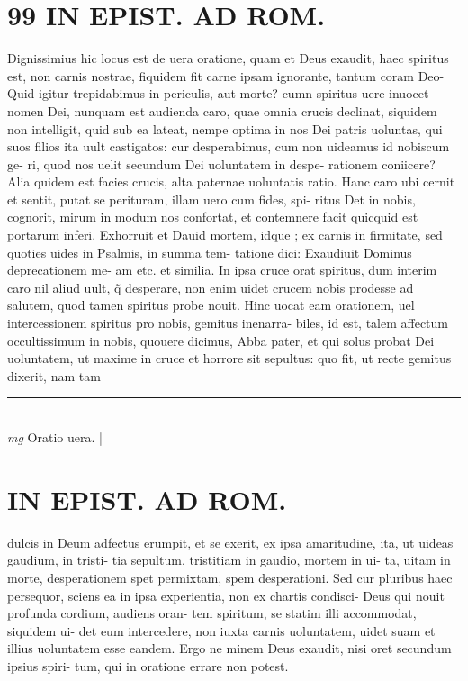 \documentclass{article}
\begin{document}
\begin{pages}
\section*{99 IN EPIST. AD ROM.  }
\marginpar{[ p.]}\pstart Dignissimius hic locus est de uera oratione, quam et Deus exaudit, haec spiritus est, non carnis nostrae, fiquidem fit carne ipsam ignorante, tantum coram Deo- Quid igitur trepidabimus in periculis, aut morte? cumn spiritus uere inuocet nomen Dei, nunquam est audienda caro, quae omnia crucis declinat, siquidem non intelligit, quid sub ea lateat, nempe optima in nos Dei patris uoluntas, qui suos filios ita uult castigatos: cur desperabimus, cum non uideamus id nobiscum ge- ri, quod nos uelit secundum Dei uoluntatem in despe- rationem coniicere? Alia quidem est facies crucis, alta paternae uoluntatis ratio. Hanc caro ubi cernit et sentit, putat se perituram, illam uero cum fides, spi- ritus Det in nobis, cognorit, mirum in modum nos confortat, et contemnere facit quicquid est portarum inferi. Exhorruit et Dauid mortem, idque ; ex carnis in firmitate, sed quoties uides in Psalmis, in summa tem- tatione dici: Exaudiuit Dominus deprecationem me- am etc. et similia. In ipsa cruce orat spiritus, dum interim caro nil aliud uult, q̃ desperare, non enim uidet crucem nobis prodesse ad salutem, quod tamen spiritus probe nouit. Hinc uocat eam orationem, uel intercessionem spiritus pro nobis, gemitus inenarra- biles, id est, talem affectum occultissimum in nobis, quouere dicimus, Abba pater, et qui solus probat Dei uoluntatem, ut maxime in cruce et horrore sit sepultus: quo fit, ut recte gemitus dixerit, nam tam  \pend
\vspace{0.5cm}\noindent
\vspace{0.2cm}\rule{1cm}{0.2pt}\\ 
\hspace{0.2cm}\textit{mg}
\footnotesize Oratio uera.  
\normalsize| 
\section*{IN EPIST. AD ROM.  }
\marginpar{[ p.102 ]}\pstart dulcis in Deum adfectus erumpit, et se exerit, ex ipsa amaritudine, ita, ut uideas gaudium, in tristi- tia sepultum, tristitiam in gaudio, mortem in ui- ta, uitam in morte, desperationem spet permixtam, spem desperationi. Sed cur pluribus haec persequor, sciens ea in ipsa experientia, non ex chartis condisci-  \pend\pstart Deus qui nouit profunda cordium, audiens oran- tem spiritum, se statim illi accommodat, siquidem ui- det eum intercedere, non iuxta carnis uoluntatem, uidet suam et illius uoluntatem esse eandem. Ergo ne minem Deus exaudit, nisi oret secundum ipsius spiri- tum, qui in oratione errare non potest.   \pend
{}
{}

\end{pages}
\end{document}
